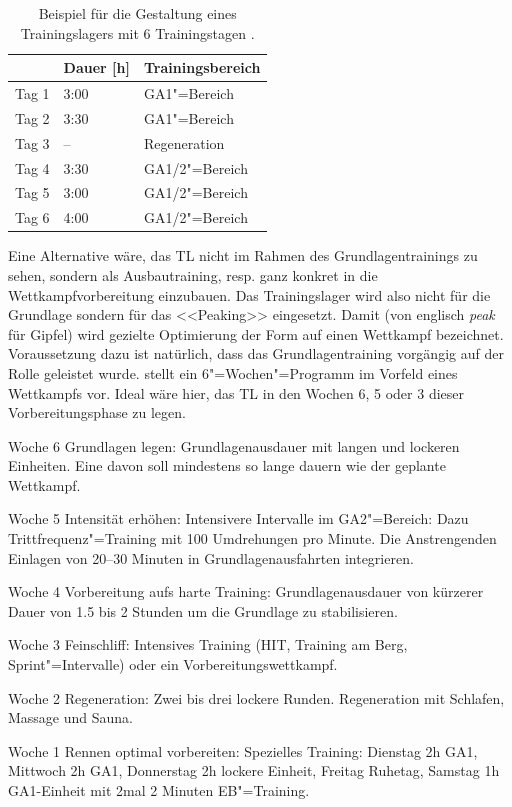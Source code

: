 \documentclass[a4paper,DIV13,BCOR0cm,draft=TRUE]{scrartcl}
\begin{document}
\begin{table}
        \centering
\begin{tabular}{lll}
    \toprule
    & Dauer [h] & Trainingsbereich \\
    \midrule
        Tag 1 & 3:00 & GA1"=Bereich \\
        Tag 2 & 3:30 & GA1"=Bereich \\
        Tag 3 & -- & Regeneration \\
        Tag 4 & 3:30 & GA1/2"=Bereich \\
        Tag 5 & 3:00 & GA1/2"=Bereich \\
        Tag 6 & 4:00 & GA1/2"=Bereich \\
    \bottomrule
\end{tabular}
\caption{Beispiel für die Gestaltung eines Trainingslagers mit 6 Trainingstagen \protect\cite{Beck2015}.}
        \label{tab:beispielplan}
\end{table}

Eine Alternative wäre, das TL nicht im Rahmen des Grundlagentrainings zu sehen,
sondern als Ausbautraining, resp. ganz konkret in die Wettkampfvorbereitung einzubauen.
Das Trainingslager wird also nicht für die Grundlage sondern für das <<Peaking>> eingesetzt.
Damit (von englisch \textit{peak} für Gipfel) wird gezielte Optimierung der Form auf einen Wettkampf bezeichnet.
Voraussetzung dazu ist natürlich, dass das Grundlagentraining vorgängig auf der Rolle geleistet wurde.
 stellt ein 6"=Wochen"=Programm im Vorfeld eines Wettkampfs vor.
Ideal wäre hier, das TL in den Wochen 6, 5 oder 3 dieser Vorbereitungsphase zu legen.

\begin{itemize*}
        \item Woche 6 Grundlagen legen:
                Grundlagenausdauer mit langen und lockeren Einheiten.
                Eine davon soll mindestens so lange dauern wie der geplante Wettkampf.
        \item Woche 5 Intensität erhöhen:
                Intensivere Intervalle im GA2"=Bereich:
                Dazu Trittfrequenz"=Training mit 100 Umdrehungen pro Minute.
                Die Anstrengenden Einlagen von 20--30 Minuten in Grundlagenausfahrten integrieren.
        \item Woche 4 Vorbereitung aufs harte Training:
                Grundlagenausdauer von kürzerer Dauer von 1.5 bis 2 Stunden
                um die Grundlage zu stabilisieren.
        \item Woche 3 Feinschliff:
                Intensives Training (HIT, Training am Berg, Sprint"=Intervalle) oder ein Vorbereitungswettkampf.
        \item Woche 2 Regeneration:
                Zwei bis drei lockere Runden. Regeneration mit Schlafen, Massage und Sauna.
        \item Woche 1 Rennen optimal vorbereiten:
                Spezielles Training: Dienstag 2h GA1, Mittwoch 2h GA1, Donnerstag 2h lockere Einheit, Freitag Ruhetag, 
                Samstag 1h GA1-Einheit mit 2mal 2 Minuten EB"=Training.

\end{itemize*}
\end{document}
